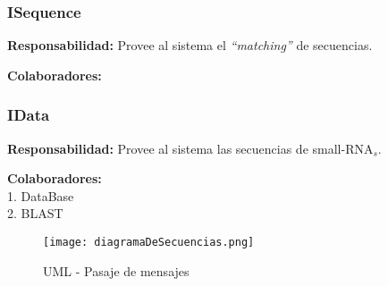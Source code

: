 \subsubsection{ISequence}
\par \textbf{Responsabilidad:} Provee al sistema el \emph{``matching''} de secuencias.
	
\par \textbf{Colaboradores:} 

\subsubsection{IData}
\par \textbf{Responsabilidad:} Provee al sistema las secuencias de small-RNA$_s$.

\par \textbf{Colaboradores:} \\
\hspace*{3.75cm} 1. DataBase \\
\hspace*{3.75cm} 2. BLAST \\

\begin{figure}
  \centering
  \texttt{[image: diagramaDeSecuencias.png]}  
  \caption{UML - Pasaje de mensajes}
  \label{mensajes}
\end{figure}

